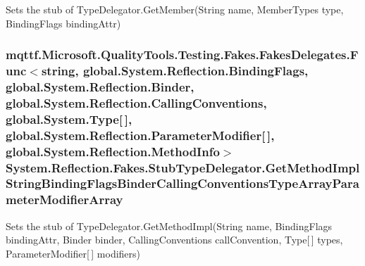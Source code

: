 Sets the stub of Type\-Delegator.\-Get\-Member(\-String name, Member\-Types type, Binding\-Flags binding\-Attr)

\hypertarget{class_system_1_1_reflection_1_1_fakes_1_1_stub_type_delegator_ac06eb077d74ff303fdf2090c0c35ce3a}{
\subsubsection[{Get\-Method\-Impl\-String\-Binding\-Flags\-Binder\-Calling\-Conventions\-Type\-Array\-Parameter\-Modifier\-Array}]{\setlength{\rightskip}{0pt plus 5cm}mqttf.\-Microsoft.\-Quality\-Tools.\-Testing.\-Fakes.\-Fakes\-Delegates.\-Func$<$string, global.\-System.\-Reflection.\-Binding\-Flags, global.\-System.\-Reflection.\-Binder, global.\-System.\-Reflection.\-Calling\-Conventions, global.\-System.\-Type\mbox{[}$\,$\mbox{]}, global.\-System.\-Reflection.\-Parameter\-Modifier\mbox{[}$\,$\mbox{]}, global.\-System.\-Reflection.\-Method\-Info$>$ System.\-Reflection.\-Fakes.\-Stub\-Type\-Delegator.\-Get\-Method\-Impl\-String\-Binding\-Flags\-Binder\-Calling\-Conventions\-Type\-Array\-Parameter\-Modifier\-Array}}\label{class_system_1_1_reflection_1_1_fakes_1_1_stub_type_delegator_ac06eb077d74ff303fdf2090c0c35ce3a}


Sets the stub of Type\-Delegator.\-Get\-Method\-Impl(\-String name, Binding\-Flags binding\-Attr, Binder binder, Calling\-Conventions call\-Convention, Type\mbox{[}$\,$\mbox{]} types, Parameter\-Modifier\mbox{[}$\,$\mbox{]} modifiers)

